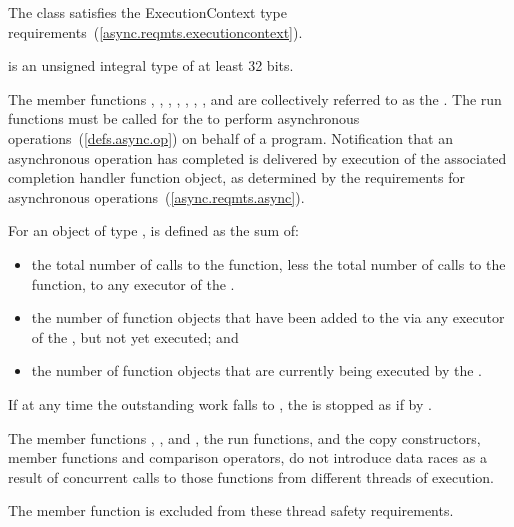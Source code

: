 \pnum
The class  satisfies the ExecutionContext type requirements~(\ref{async.reqmts.executioncontext}).

%
\pnum
{} is an 
unsigned integral type of at least 32 bits.

\pnum
The  member functions , , , , , , , and  are collectively referred to as the . The run functions must be called for the  to perform asynchronous operations~(\ref{defs.async.op}) on behalf of a \Cpp program. Notification that an asynchronous operation has completed is delivered by execution of the associated completion handler function object, as determined by the requirements for asynchronous operations~(\ref{async.reqmts.async}).

\pnum
For an object of type ,  is defined as the sum of:

\begin{itemize}
\item
the total number of calls to the  function, less the total number of calls to the  function, to any executor of the .
\item
the number of function objects that have been added to the  via any executor of the , but not yet executed; and
\item
the number of function objects that are currently being executed by the .
\end{itemize}

\pnum
If at any time the outstanding work falls to , the  is stopped as if by .

\pnum
The  member functions , , and , the run functions, and the  copy constructors, member functions and comparison operators, do not introduce data races as a result of concurrent calls to those functions from different threads of execution. \begin{note} The  member function is excluded from these thread safety requirements. \end{note}


